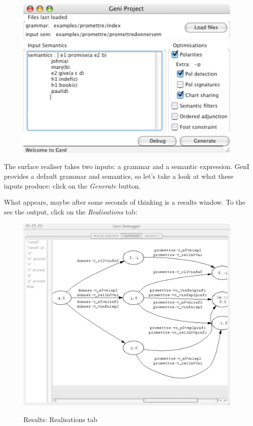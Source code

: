 \documentclass[11pt]{article}
\newcommand{\commandgui}{\textit}
\begin{document}
\begin{figure}[h]
\begin{center}
\includegraphics[scale=0.75]{images/geni_gui.pdf}
\label{fig:geni_screenshot}
\end{center}
\end{figure}

The surface realiser takes two inputs: a grammar and a semantic
expression. GenI provides a default grammar and semantics, so
let's take a look at what these inputs produce: click on the 
\commandgui{Generate} button.

What appears, maybe after some seconds of thinking is a results window.
To the see the output, click on the \commandgui{Realisations} tab:  

\begin{figure}[h]
\begin{center}
\includegraphics[scale=0.75]{images/geni_polaut.pdf}
\label{fig:geni_results}
\caption{Results: Realisations tab}
\end{center}
\end{figure}
\end{document}
